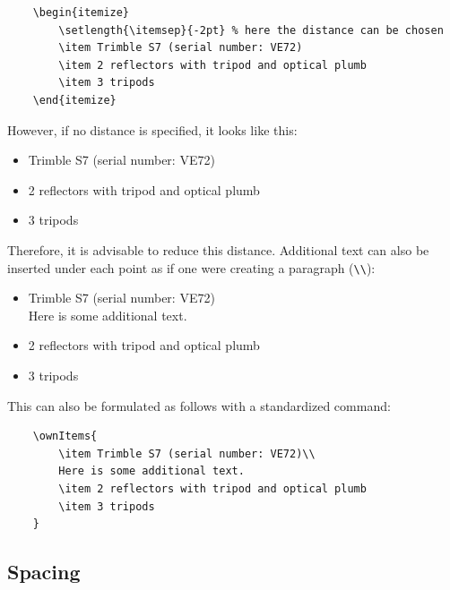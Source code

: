 \begin{verbatim}
    \begin{itemize}	
    	\setlength{\itemsep}{-2pt} % here the distance can be chosen
    	\item Trimble S7 (serial number: VE72)
    	\item 2 reflectors with tripod and optical plumb
    	\item 3 tripods
    \end{itemize}
\end{verbatim}

However, if no distance is specified, it looks like this:

\begin{itemize}	
	\item Trimble S7 (serial number: VE72)
	\item 2 reflectors with tripod and optical plumb
	\item 3 tripods
\end{itemize}

Therefore, it is advisable to reduce this distance. Additional text can also be inserted under each point as if one were creating a paragraph (\verb|\\|):

\begin{itemize}	
	\setlength{\itemsep}{-2pt} %
	\item Trimble S7 (serial number: VE72)\\
	Here is some additional text.
	\item 2 reflectors with tripod and optical plumb
	\item 3 tripods
\end{itemize}

This can also be formulated as follows with a standardized command:

\begin{verbatim}
    \ownItems{
        \item Trimble S7 (serial number: VE72)\\
        Here is some additional text.
        \item 2 reflectors with tripod and optical plumb
        \item 3 tripods
    }
\end{verbatim}


\subsection{Spacing}

